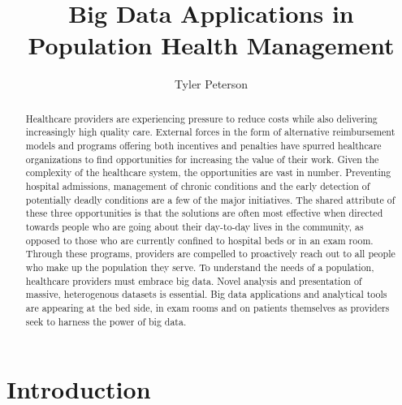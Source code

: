 \documentclass[sigconf]{acmart}
\begin{document}
\title{Big Data Applications in Population Health Management}


\author{Tyler Peterson}



\renewcommand{\shortauthors}{B. Trovato et al.}


\begin{abstract}

  Healthcare providers are experiencing pressure to reduce costs while also delivering increasingly high quality care. External forces in the form of alternative reimbursement models and programs offering both incentives and penalties have spurred healthcare organizations to find opportunities for increasing the value of their work. Given the complexity of the healthcare system, the opportunities are vast in number. Preventing hospital admissions, management of chronic conditions and the early detection of potentially deadly conditions are a few of the major initiatives. The shared attribute of these three opportunities is that the solutions are often most effective when directed towards people who are going about their day-to-day lives in the community, as opposed to those who are currently confined to hospital beds or in an exam room. Through these programs, providers are compelled to proactively reach out to all people who make up the population they serve. To understand the needs of a population, healthcare providers must embrace big data. Novel analysis and presentation of massive, heterogenous datasets is essential. Big data applications and analytical tools are appearing at the bed side, in exam rooms and on patients themselves as providers seek to harness the power of big data.
  
\end{abstract}



\maketitle

\section{Introduction}
\end{document}
